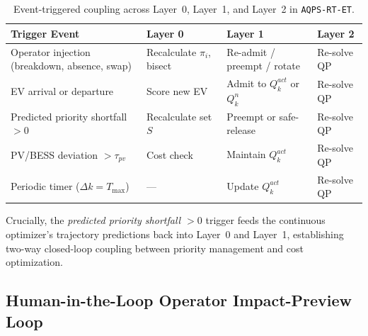 \documentclass[final,3p,times,twocolumn]{elsarticle}
\begin{document}
\begin{table}[htbp]
\centering
\caption{Event-triggered coupling across Layer~0, Layer~1, and Layer~2 in \texttt{AQPS-RT-ET}.}
\label{tab:events}
\footnotesize
\begin{tabular}{p{2.7cm}p{1.4cm}p{1.5cm}p{1.1cm}}
\toprule
Trigger Event & Layer 0 & Layer 1 & Layer 2 \\
\midrule
Operator injection (breakdown, absence, swap) & Recalculate $\pi_i$, bisect & Re-admit / preempt / rotate & Re-solve QP \\
EV arrival or departure & Score new EV & Admit to $Q_k^{act}$ or $Q_k^n$ & Re-solve QP \\
Predicted priority shortfall $> 0$ & Recalculate set $S$ & Preempt or safe-release & Re-solve QP \\
PV/BESS deviation $> \tau_{pv}$ & Cost check & Maintain $Q_k^{act}$ & Re-solve QP \\
Periodic timer ($\Delta k = T_{\max}$) & --- & Update $Q_k^{act}$ & Re-solve QP \\
\bottomrule
\end{tabular}
\end{table}

Crucially, the \textit{predicted priority shortfall $> 0$} trigger feeds the continuous optimizer's trajectory predictions back into Layer~0 and Layer~1, establishing two-way closed-loop coupling between priority management and cost optimization.

\subsection{Human-in-the-Loop Operator Impact-Preview Loop}
\label{sec:preview}
\end{document}
